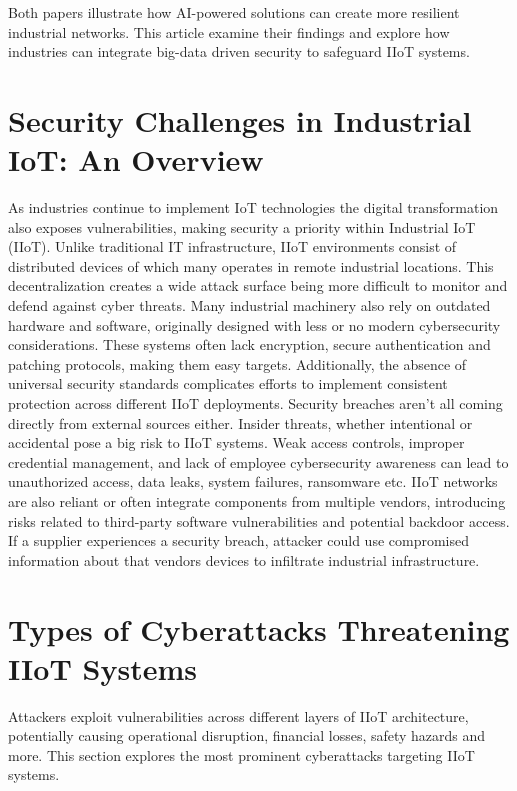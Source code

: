 \documentclass[article,a4paper]{IEEEtran}
\begin{document}
Both papers illustrate how AI-powered solutions can create more resilient industrial networks. This article examine their findings and explore how industries can integrate big-data driven security to safeguard IIoT systems. 
\section{Security Challenges in Industrial IoT: An Overview}
As industries continue to implement IoT technologies the digital transformation also exposes vulnerabilities, making security a priority within Industrial IoT (IIoT). Unlike traditional IT infrastructure, IIoT environments consist of distributed devices of which many operates in remote industrial locations. This decentralization creates a wide attack surface being more difficult to monitor and defend against cyber threats. 
\newline\newline
Many industrial machinery also rely on outdated hardware and software, originally designed with less or no modern cybersecurity considerations. These systems often lack encryption, secure authentication and patching protocols, making them easy targets. Additionally, the absence of universal security standards complicates efforts to implement consistent protection across different IIoT deployments. Security breaches aren't all coming directly from external sources either. Insider threats, whether intentional or accidental pose a big risk to IIoT systems. Weak access controls, improper credential management, and lack of employee cybersecurity awareness can lead to unauthorized access, data leaks, system failures, ransomware etc. 
\newline\newline
IIoT networks are also reliant or often integrate components from multiple vendors, introducing risks related to third-party software vulnerabilities and potential backdoor access. If a supplier experiences a security breach, attacker could use compromised information about that vendors devices to infiltrate industrial infrastructure.
\section{Types of Cyberattacks Threatening IIoT Systems}
Attackers exploit vulnerabilities across different layers of IIoT architecture, potentially causing operational disruption, financial losses, safety hazards and more. This section explores the most prominent cyberattacks targeting IIoT systems. 
\end{document}
